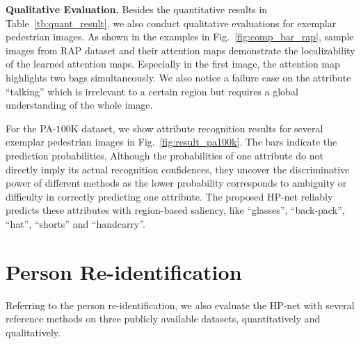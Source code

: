\documentclass[10pt,twocolumn,letterpaper]{article}
\begin{document}
\noindent\textbf{Qualitative Evaluation.}
%
Besides the quantitative results in Table~\ref{tb:quant_result}, we also conduct qualitative evaluations for exemplar pedestrian images.
%
As shown in the examples in Fig.~\ref{fig:comp_bar_rap}, sample images from RAP dataset and their attention maps demonstrate the localizability of the learned attention maps.
%
Especially in the first image, the attention map highlights two bags simultaneously.
%
We also notice a failure case on the attribute ``talking'' which is irrelevant to a certain region but requires a global understanding of the whole image.

For the PA-$100$K dataset, we show attribute recognition results for several exemplar pedestrian images in Fig.~\ref{fig:result_pa100k}.
%
The bars indicate the prediction probabilities.
%
Although the probabilities of one attribute do not directly imply its actual recognition confidences, they uncover the discriminative power of different methods as the lower probability corresponds to ambiguity or difficulty in correctly predicting one attribute.
%
The proposed HP-net reliably predicts these attributes with region-based saliency, like ``glasses'', ``back-pack'', ``hat'', ``shorts'' and ``handcarry''.







\section{Person Re-identification}
\label{sec:exp_reid}

Referring to the person re-identification,
%
we also evaluate the HP-net with several reference methods on three publicly available datasets, quantitatively and qualitatively.
\end{document}
